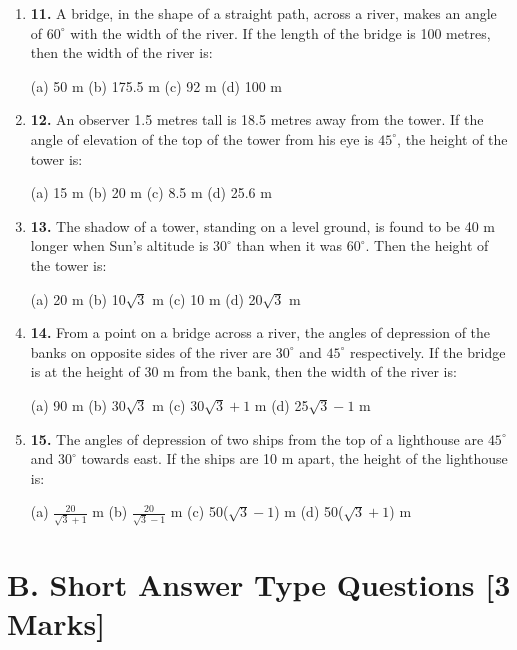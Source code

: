\documentclass{article}
\begin{document}
\begin{enumerate}
	\item \textbf{11.} A bridge, in the shape of a straight path, across a river, makes an angle of $60^\circ$ with the width of the river. If the length of the bridge is 100 metres, then the width of the river is:  
	
	
	(a) 50 m \quad (b) 175.5 m \quad (c) 92 m \quad (d) 100 m
	
	\vspace{0.5cm}
	
	\item \textbf{12.} An observer 1.5 metres tall is 18.5 metres away from the tower. If the angle of elevation of the top of the tower from his eye is $45^\circ$, the height of the tower is:  
	
	
	(a) 15 m \quad (b) 20 m \quad (c) 8.5 m \quad (d) 25.6 m
	
	\vspace{0.5cm}
	
	\item \textbf{13.} The shadow of a tower, standing on a level ground, is found to be 40 m longer when Sun's altitude is $30^\circ$ than when it was $60^\circ$. Then the height of the tower is:  
	
	
	(a) 20 m \quad (b) 10$\sqrt{3}$ m \quad (c) 10 m \quad (d) 20$\sqrt{3}$ m
	
	\vspace{0.5cm}
	
	\item \textbf{14.} From a point on a bridge across a river, the angles of depression of the banks on opposite sides of the river are $30^\circ$ and $45^\circ$ respectively. If the bridge is at the height of 30 m from the bank, then the width of the river is:  
	
	
	(a) 90 m \quad (b) 30$\sqrt{3}$ m \quad (c) 30$\sqrt{3} + 1$ m \quad (d) 25$\sqrt{3} - 1$ m
	
	\vspace{0.5cm}
	
	\item \textbf{15.} The angles of depression of two ships from the top of a lighthouse are $45^\circ$ and $30^\circ$ towards east. If the ships are 10 m apart, the height of the lighthouse is: 
	
	 
	(a) $\frac{20}{\sqrt{3} + 1}$ m \quad (b) $\frac{20}{\sqrt{3} - 1}$ m \quad (c) 50($\sqrt{3} - 1$) m \quad (d) 50($\sqrt{3} + 1$) m
\end{enumerate}

\section*{B. Short Answer Type Questions \hfill [3 Marks]}
\end{document}

